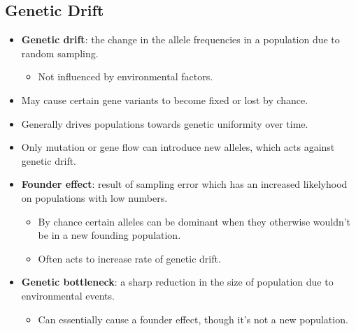 \documentclass[12pt,a4paper]{article}
\begin{document}
\subsection{Genetic Drift}
\begin{itemize}
    \item \textbf{Genetic drift}: the change in the {\color{o-Sun} allele frequencies} in a population due to {\color{o-Sun}random sampling}.
        \begin{itemize}
            \item Not influenced by environmental factors.
        \end{itemize}
    \item May cause certain gene variants to become fixed or lost by chance.
    \item Generally drives populations towards genetic uniformity over time.
    \item Only mutation or gene flow can introduce new alleles, which acts against genetic drift.
    \item \textbf{Founder effect}: result of sampling error which has an increased likelyhood on populations with low numbers.
        \begin{itemize}
            \item By chance certain alleles can be dominant when they otherwise wouldn't be in a new founding population.
            \item Often acts to increase rate of genetic drift.
        \end{itemize}
    \item \textbf{Genetic bottleneck}: a sharp reduction in the size of population due to environmental events. 
        \begin{itemize}
            \item Can essentially cause a founder effect, though it's not a new population.
        \end{itemize}
\end{itemize}
\end{document}
